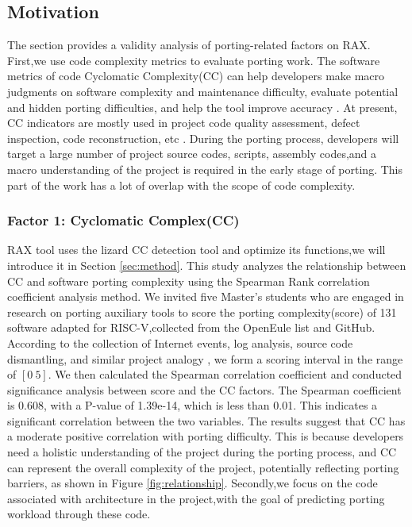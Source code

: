 \documentclass[sigconf,screen,review,anonymous]{acmart}
\begin{document}
\subsection{Motivation}
The section provides a validity analysis of porting-related factors on RAX.
First,we use code complexity metrics to evaluate porting work.
The software metrics of code Cyclomatic Complexity(CC) can help developers make macro judgments on software complexity and maintenance difficulty, evaluate potential and hidden porting difficulties, and help the tool improve accuracy \cite{2005Exploring}.
At present, CC indicators are mostly used in project code quality assessment, defect inspection, code reconstruction, etc \cite{1991Cyclomatic}.
During the porting process, developers will target a large number of project source codes, scripts, assembly codes,and a macro understanding of the project is required in the early stage of porting.
This part of the work has a lot of overlap with the scope of code complexity.

\subsubsection{Factor 1: Cyclomatic Complex(CC)}
\label{sec:factor-1}
RAX tool uses the lizard CC detection tool and optimize its functions,we will introduce it in Section \ref{sec:method}.
This study analyzes the relationship between CC and software porting complexity using the Spearman Rank correlation coefficient analysis method.
We invited five Master's students who are engaged in research on porting auxiliary tools to score the porting complexity(score) of 131 software adapted for RISC-V,collected from the OpenEule list and GitHub.
According to the collection of Internet events, log analysis, source code dismantling, and similar project analogy \cite{liangguanyu2020}, we form a scoring interval in the range of $[0~5]$.
We then calculated the Spearman correlation coefficient and conducted significance analysis between score and the CC factors.
The Spearman coefficient is 0.608, with a P-value of 1.39e-14, which is less than 0.01.
This indicates a significant correlation between the two variables.
The results suggest that CC has a moderate positive correlation with porting difficulty.
This is because developers need a holistic understanding of the project during the porting process, and CC can represent the overall complexity of the project, potentially reflecting porting barriers, as shown in Figure \ref{fig:relationship}.
Secondly,we focus on the code associated with architecture in the project,with the goal of predicting porting workload through these code.
\end{document}
